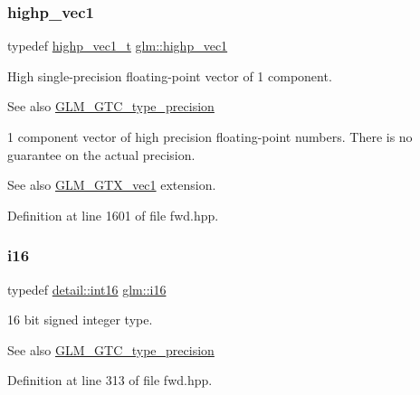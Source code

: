 \subsubsection{\texorpdfstring{highp\+\_\+vec1}{highp\_vec1}}
{\footnotesize\ttfamily typedef \hyperlink{namespaceglm_aa500b77d9369f9121bdd014d0e64c4f2}{highp\+\_\+vec1\+\_\+t} \hyperlink{group__gtc__type__precision_gab3f08c031846e7a95b49e81c48d920d3}{glm\+::highp\+\_\+vec1}}

High single-\/precision floating-\/point vector of 1 component. \begin{DoxySeeAlso}{See also}
\hyperlink{group__gtc__type__precision}{G\+L\+M\+\_\+\+G\+T\+C\+\_\+type\+\_\+precision}
\end{DoxySeeAlso}
1 component vector of high precision floating-\/point numbers. There is no guarantee on the actual precision. \begin{DoxySeeAlso}{See also}
\hyperlink{group__gtx__vec1}{G\+L\+M\+\_\+\+G\+T\+X\+\_\+vec1} extension. 
\end{DoxySeeAlso}


Definition at line 1601 of file fwd.\+hpp.

\mbox{\label{group__gtc__type__precision_ga35e5542ca05b29cc256fdafb8503d1fd}} 
\subsubsection{\texorpdfstring{i16}{i16}}
{\footnotesize\ttfamily typedef \hyperlink{namespaceglm_1_1detail_a375938874ca4f0a0982ec6373b56117b}{detail\+::int16} \hyperlink{group__gtc__type__precision_ga35e5542ca05b29cc256fdafb8503d1fd}{glm\+::i16}}

16 bit signed integer type. \begin{DoxySeeAlso}{See also}
\hyperlink{group__gtc__type__precision}{G\+L\+M\+\_\+\+G\+T\+C\+\_\+type\+\_\+precision} 
\end{DoxySeeAlso}


Definition at line 313 of file fwd.\+hpp.

\mbox{\label{group__gtc__type__precision_gaa3a2fe05ca6a7086c5580922ebda4bf3}} 
